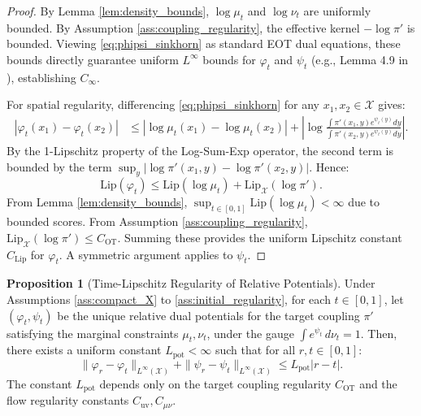 \documentclass[11pt]{article}
\theoremstyle{definition}
\newtheorem{proposition}[theorem]{Proposition}
\newtheorem{corollary}[theorem]{Corollary}
\numberwithin{equation}{section}%
\begin{document}
{\begin{proof}
By Lemma \ref{lem:density_bounds}, $\log \mu_t$ and $\log \nu_t$ are uniformly bounded. By Assumption \ref{ass:coupling_regularity}, the effective kernel $-\log \pi'$ is bounded. Viewing \eqref{eq:phipsi_sinkhorn} as standard EOT dual equations, these bounds directly guarantee uniform $L^\infty$ bounds for $\varphi_t$ and $\psi_t$ (e.g., Lemma 4.9 in \cite{nutz2021introduction}), establishing $C_{\infty}$.

For spatial regularity, differencing \eqref{eq:phipsi_sinkhorn} for any $x_1, x_2 \in \mathcal{X}$ gives:
\begin{align*}
|\varphi_t(x_1) - \varphi_t(x_2)| &\le |\log \mu_t(x_1) - \log \mu_t(x_2)| + \left| \log \frac{\int \pi'(x_1,y) e^{\psi_t(y)} dy}{\int \pi'(x_2,y) e^{\psi_t(y)} dy} \right|.
\end{align*}
By the 1-Lipschitz property of the Log-Sum-Exp operator, the second term is bounded by the term $\sup_y |\log \pi'(x_1,y) - \log \pi'(x_2,y)|$. 
Hence:
\[
\mathrm{Lip}(\varphi_t) \le \mathrm{Lip}(\log \mu_t) + \mathrm{Lip}_{\mathcal{X}}(\log \pi').
\]
From Lemma \ref{lem:density_bounds}, $\sup_{t \in [0,1]} \mathrm{Lip}(\log \mu_t) < \infty$ due to bounded scores. From Assumption \ref{ass:coupling_regularity}, $\mathrm{Lip}_{\mathcal{X}}(\log \pi') \le C_\mathrm{OT}$. Summing these provides the uniform Lipschitz constant $C_{\mathrm{Lip}}$ for $\varphi_t$. A symmetric argument applies to $\psi_t$.
\end{proof}



\begin{proposition}[Time-Lipschitz Regularity of Relative Potentials]
\label{prop:pot_Lip_time_Linfty}
Under Assumptions \ref{ass:compact_X} to \ref{ass:initial_regularity}, for each $t \in [0,1]$, let $(\varphi_t, \psi_t)$ be the unique relative dual potentials for the target coupling $\pi'$ satisfying the marginal constraints $\mu_t, \nu_t$, under the gauge $\int e^{\psi_t} \, d\nu_t = 1$. Then, there exists a uniform constant $L_{\mathrm{pot}} < \infty$ such that for all $r, t \in [0,1]$:
\begin{equation*}
\|\varphi_r - \varphi_t\|_{L^\infty(\mathcal{X})} + \|\psi_r - \psi_t\|_{L^\infty(\mathcal{X})} \le L_{\mathrm{pot}} |r - t|.
\end{equation*}
The constant $L_{\mathrm{pot}}$ depends only on the target coupling regularity $C_\mathrm{OT}$ and the flow regularity constants $C_\mathrm{uv}, C_{\mu\nu}$.
\end{proposition}

}
\end{document}
